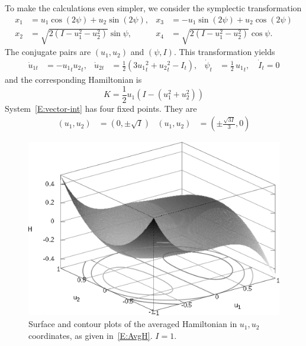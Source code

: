 To make the calculations even simpler, we consider the symplectic transformation
\begin{equation}
\label{E:combin_transf}
\begin{aligned}
x_1 &= u_1 \cos(2 \psi) + u_2 \sin(2 \psi), & x_3 &= -u_1 \sin(2 \psi) + u_2 \cos(2 \psi)\\
x_2 &= \sqrt {2 (I-u_1^2-u_2^2)} \sin \psi, & x_4 &= \sqrt {2 (I - u_1^2 - u_2^2)} \cos \psi.
\end{aligned}
\end{equation}
The conjugate pairs are $(u_1,u_2)$ and $(\psi,I)$. This transformation yields
\begin{align}
\label{E:vector-int}
\dot u_{1t} &= - {u_1}_t {u_2}_t , & \dot u_{2t} &= \frac12 (3 {u_1}_t^2 + {u_2}_t^2 -I_t), & \dot \psi_t &= \frac12\,{u_1}_t, \quad \dot I_t = 0
\end{align}
and the corresponding Hamiltonian is
\begin{equation}
K = \frac12 u_1 \left(I - (u_1^2 +u_2^2)\right)
\label{E:AvgH}
\end{equation}
System~\eqref{E:vector-int} has four fixed points. They are
\begin{align*}
(u_1, u_2) &= (0, \pm \sqrt{I}) & (u_1, u_2) &= (\pm \frac{\sqrt{3 I}}{3}, 0)
\end{align*}
\begin{figure}
\begin{center}
\includegraphics[width=\textwidth]{figures/h_surf}
\caption{Surface and contour plots of the averaged Hamiltonian in $u_1,u_2$ coordinates, as given in~\eqref{E:AvgH}. $I = 1$.}
\label{f:autoparam Hamiltonian}
\end{center}
\end{figure}

